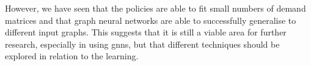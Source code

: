 However, we have seen that the policies are able to fit small numbers of demand matrices and that graph neural networks are able to successfully generalise to different input graphs. This suggests that it is still a viable area for further research, especially in using \acp{gnn}, but that different techniques should be explored in relation to the learning.
